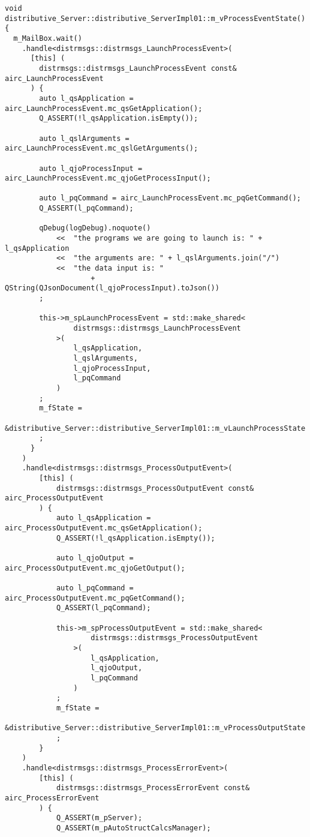 \begin{verbatim}
void distributive_Server::distributive_ServerImpl01::m_vProcessEventState()   {
  m_MailBox.wait()
    .handle<distrmsgs::distrmsgs_LaunchProcessEvent>(
      [this] (
        distrmsgs::distrmsgs_LaunchProcessEvent const& airc_LaunchProcessEvent
      ) {
        auto l_qsApplication =  airc_LaunchProcessEvent.mc_qsGetApplication();
        Q_ASSERT(!l_qsApplication.isEmpty());

        auto l_qslArguments = airc_LaunchProcessEvent.mc_qslGetArguments();

        auto l_qjoProcessInput = airc_LaunchProcessEvent.mc_qjoGetProcessInput();

        auto l_pqCommand = airc_LaunchProcessEvent.mc_pqGetCommand();
        Q_ASSERT(l_pqCommand);

        qDebug(logDebug).noquote()
            <<  "the programs we are going to launch is: " + l_qsApplication
            <<  "the arguments are: " + l_qslArguments.join("/")
            <<  "the data input is: "
                    + QString(QJsonDocument(l_qjoProcessInput).toJson())
        ;

        this->m_spLaunchProcessEvent = std::make_shared<
                distrmsgs::distrmsgs_LaunchProcessEvent
            >(
                l_qsApplication,
                l_qslArguments,
                l_qjoProcessInput,
                l_pqCommand
            )
        ;
        m_fState =
            &distributive_Server::distributive_ServerImpl01::m_vLaunchProcessState
        ;
      }
    )
    .handle<distrmsgs::distrmsgs_ProcessOutputEvent>(
        [this] (
            distrmsgs::distrmsgs_ProcessOutputEvent const& airc_ProcessOutputEvent
        ) {
            auto l_qsApplication =  airc_ProcessOutputEvent.mc_qsGetApplication();
            Q_ASSERT(!l_qsApplication.isEmpty());

            auto l_qjoOutput = airc_ProcessOutputEvent.mc_qjoGetOutput();

            auto l_pqCommand = airc_ProcessOutputEvent.mc_pqGetCommand();
            Q_ASSERT(l_pqCommand);

            this->m_spProcessOutputEvent = std::make_shared<
                    distrmsgs::distrmsgs_ProcessOutputEvent
                >(
                    l_qsApplication,
                    l_qjoOutput,
                    l_pqCommand
                )
            ;
            m_fState =
                &distributive_Server::distributive_ServerImpl01::m_vProcessOutputState
            ;
        }
    )
    .handle<distrmsgs::distrmsgs_ProcessErrorEvent>(
        [this] (
            distrmsgs::distrmsgs_ProcessErrorEvent const& airc_ProcessErrorEvent
        ) {
            Q_ASSERT(m_pServer);
            Q_ASSERT(m_pAutoStructCalcsManager);


\end{verbatim}
